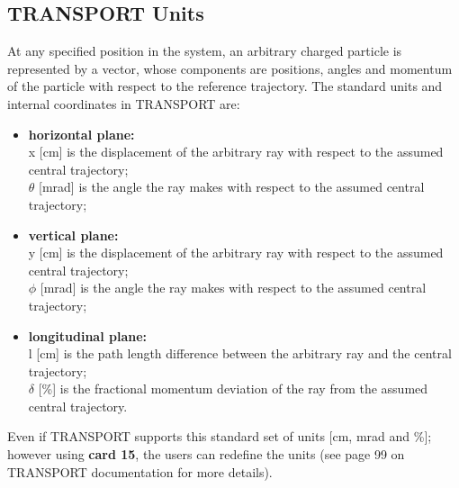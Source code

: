 \subsection{TRANSPORT Units}
\label{ssec:TRAN_units}
At any specified position in the system, an arbitrary charged particle is represented by a vector, whose components are positions, angles and momentum of the particle with respect to the reference trajectory. The standard units and internal coordinates in TRANSPORT are:
\begin{itemize}
\item \textbf{horizontal plane:} \\
x [cm] is the displacement of the arbitrary ray with respect to the assumed central trajectory;\\
$\theta$ [mrad] is the angle the ray makes with respect to the assumed central trajectory;
\item \textbf{vertical plane:}\\
y [cm] is the displacement of the arbitrary ray with respect to the assumed central trajectory;\\
$\phi$ [mrad] is the angle the ray makes with respect to the assumed central trajectory;
\item \textbf{longitudinal plane:}\\
l [cm] is the path length difference between the arbitrary ray and the central trajectory;\\
$\delta$ [\%] is the fractional momentum deviation of the ray from the assumed central trajectory.
\end{itemize}
Even if TRANSPORT supports this standard set of units [cm, mrad and \%]; however using \textbf{card 15}, the users can redefine the units (see page 99 on TRANSPORT documentation \cite{bib:transport} for more details).
